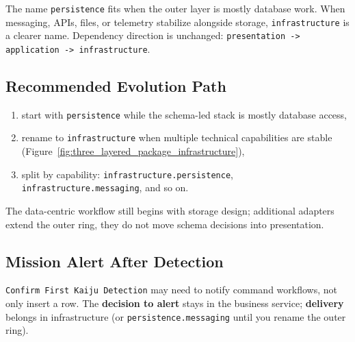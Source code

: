 The name \texttt{persistence} fits when the outer layer is mostly database work. When messaging, APIs, files, or telemetry stabilize alongside storage, \texttt{infrastructure} is a clearer name. Dependency direction is unchanged: \texttt{presentation -> application -> infrastructure}.

\subsection{Recommended Evolution Path}
\label{sec:three_layered_persistence_to_infrastructure_path}

\begin{enumerate}
    \item start with \texttt{persistence} while the schema-led stack is mostly database access,
    \item rename to \texttt{infrastructure} when multiple technical capabilities are stable (Figure~\ref{fig:three_layered_package_infrastructure}),
    \item split by capability: \texttt{infrastructure.persistence}, \texttt{infrastructure.messaging}, and so on.
\end{enumerate}

The data-centric workflow still begins with storage design; additional adapters extend the outer ring, they do not move schema decisions into presentation.

\subsection{Mission Alert After Detection}
\label{sec:three_layered_mission_alert}

\texttt{Confirm First Kaiju Detection} may need to notify command workflows, not only insert a row. The \textbf{decision to alert} stays in the business service; \textbf{delivery} belongs in infrastructure (or \texttt{persistence.messaging} until you rename the outer ring).

